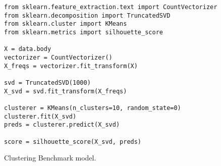\documentclass[]{article}
\begin{document}
\begin{listing}[H]
\begin{verbatim}
from sklearn.feature_extraction.text import CountVectorizer
from sklearn.decomposition import TruncatedSVD
from sklearn.cluster import KMeans
from sklearn.metrics import silhouette_score

X = data.body
vectorizer = CountVectorizer()
X_freqs = vectorizer.fit_transform(X)

svd = TruncatedSVD(1000)
X_svd = svd.fit_transform(X_freqs)

clusterer = KMeans(n_clusters=10, random_state=0)
clusterer.fit(X_svd)
preds = clusterer.predict(X_svd)

score = silhouette_score(X_svd, preds)
\end{verbatim}
\caption{Clustering Benchmark model.}
\label{listing:clusterbenchmark}
\end{listing}

\printbibliography

%
%

%

\end{document}
